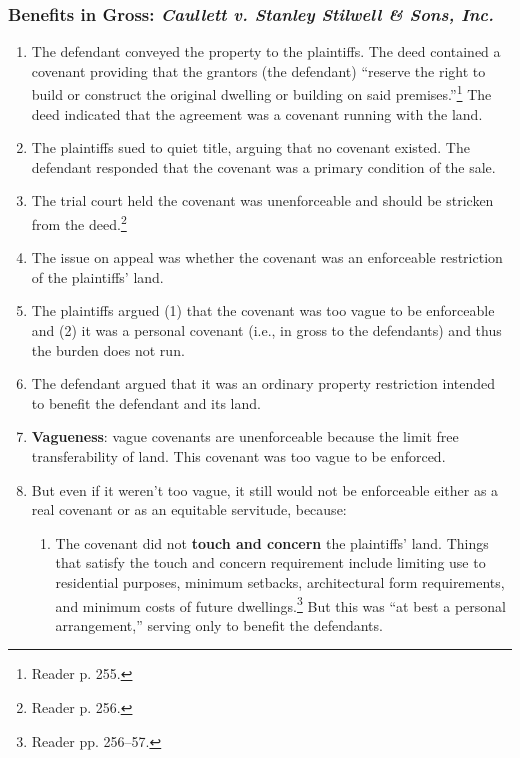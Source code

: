 \subsubsection{Benefits in Gross: \emph{Caullett v. Stanley Stilwell \& Sons, 
Inc.}}

\begin{enumerate}
    \item The defendant conveyed the property to the plaintiffs. The deed 
    contained a covenant providing that the grantors (the defendant) ``reserve 
    the right to build or construct the original dwelling or building on said 
    premises.''\footnote{Reader p. 255.} The deed indicated that the agreement 
    was a covenant running with the land.
    \item The plaintiffs sued to quiet title, arguing that no covenant 
    existed. The defendant responded that the covenant was a primary condition 
    of the sale.
    \item The trial court held the covenant was unenforceable and should be 
    stricken from the deed.\footnote{Reader p. 256.}
    \item The issue on appeal was whether the covenant was an enforceable 
    restriction of the plaintiffs' land.
    \item The plaintiffs argued (1) that the covenant was too vague to be 
    enforceable and (2) it was a personal covenant (i.e., in gross to the 
    defendants) and thus the burden does not run.
    \item The defendant argued that it was an ordinary property restriction 
    intended to benefit the defendant and its land.
    \item \textbf{Vagueness}: vague covenants are unenforceable because the 
    limit free transferability of land. This covenant was too vague to be 
    enforced.
    \item But even if it weren't too vague, it still would not be enforceable 
    either as a real covenant or as an equitable servitude, because:
    \begin{enumerate}
        \item The covenant did not \textbf{touch and concern} the plaintiffs' 
        land. Things that satisfy the touch and concern requirement include 
        limiting use to residential purposes, minimum setbacks, architectural 
        form requirements, and minimum costs of future 
        dwellings.\footnote{Reader pp. 256--57.} But this was ``at best a 
        personal arrangement,'' serving only to benefit the defendants. 

\end{enumerate}
\end{enumerate}
